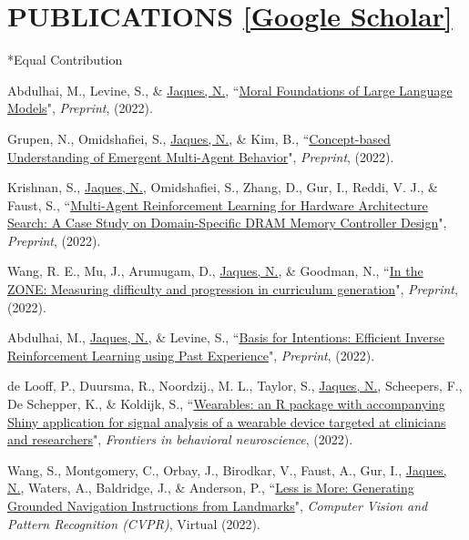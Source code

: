 \documentclass[paper=letter,fontsize=11pt]{scrartcl} %
\newcommand{\NewPart}[2]{\section*{\uppercase{#1} #2}}
\newcommand{\PaperEntry}[6]{
        \noindent #1, ``\href{#6}{#2}", \textit{#3}, #4 (#5).}
\begin{document}

\NewPart{Publications}{\href{https://scholar.google.co.uk/citations?user=8iCb2TwAAAAJ&hl=en}{[Google Scholar]}}
*Equal Contribution
\begin{etaremune}

\item \PaperEntry{Abdulhai, M., Levine, S., \& \underline{Jaques, N.}}{Moral Foundations of Large Language Models}{Preprint}{}{2022}{}

\item \PaperEntry{Grupen, N., Omidshafiei, S., \underline{Jaques, N.}, \& Kim, B.}{Concept-based Understanding of Emergent Multi-Agent Behavior}{Preprint}{}{2022}{}

\item \PaperEntry{Krishnan, S., \underline{Jaques, N.}, Omidshafiei, S., Zhang, D., Gur, I., Reddi, V. J., \& Faust, S.}{Multi-Agent Reinforcement Learning for Hardware Architecture Search: A Case Study on Domain-Specific DRAM Memory Controller Design}{Preprint}{}{2022}{}

\item \PaperEntry{Wang, R. E., Mu, J., Arumugam, D., \underline{Jaques, N.}, \& Goodman, N.}{In the ZONE: Measuring difficulty and  progression in curriculum generation}{Preprint}{}{2022}{}

\item \PaperEntry{Abdulhai, M., \underline{Jaques, N.}, \& Levine, S.}{Basis for Intentions: Efficient Inverse Reinforcement Learning using Past Experience}{Preprint}{}{2022}{https://arxiv.org/abs/2208.04919}

\item \PaperEntry{de Looff, P., Duursma, R., Noordzij., M. L., Taylor, S., \underline{Jaques, N.}, Scheepers, F., De Schepper, K., \& Koldijk, S.}{Wearables: an R package with accompanying Shiny application for signal analysis of a wearable device targeted at clinicians and researchers}{Frontiers in behavioral neuroscience}{}{2022}{https://www.frontiersin.org/articles/10.3389/fnbeh.2022.856544/pdf}

\item \PaperEntry{Wang, S., Montgomery, C., Orbay, J., Birodkar, V., Faust, A., Gur, I., \underline{Jaques, N.}, Waters, A., Baldridge, J., \& Anderson, P.}{Less is More: Generating Grounded Navigation Instructions from Landmarks}{Computer Vision and Pattern Recognition (CVPR)}{Virtual}{2022}{https://arxiv.org/abs/2111.12872}


\end{etaremune}
\end{document}
